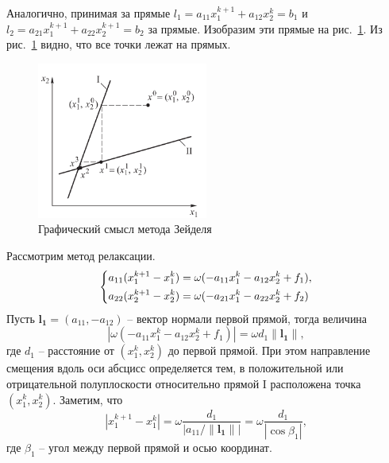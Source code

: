 \documentclass{article}
\begin{document}
\begin{enumerate}
\begin{equation}
        \end{equation}
        Аналогично, принимая за прямые $l_1 = a_{11}x_1^{k+1} + a_{12}x_2^k = b_1$ и 
        $l_2 = a_{21}x_1^{k+1} + a_{22}x_2^{k+1} = b_2$ за прямые. Изобразим эти прямые на 
        рис.~\ref{seidel_graph}. Из рис.~\ref{seidel_graph} видно, что все точки лежат на прямых.
        \begin{figure}[H]
            \center
            \includegraphics[width=0.5\textwidth]{seidel_graph.png}
            \caption{Графический смысл метода Зейделя}
            \label{seidel_graph}
        \end{figure}

        Рассмотрим метод релаксации. 
        \begin{equation}
            \begin{dcases}
                a_{11} (x_1^{k+1} - x_1^k) = \omega (-a_{11}x_1^k - a_{12}x_2^k +f_1), \\ 
                a_{22} (x_2^{k+1} - x_2^k) = \omega (-a_{21}x_1^k - a_{22}x_2^k +f_2)
            \end{dcases}
        \end{equation}
        Пусть $\boldsymbol{l_1} = (a_{11}, -a_{12})$ -- вектор нормали первой прямой, тогда 
        величина 
        \begin{equation*}
        |\omega (-a_{11}x_1^k - a_{12}x_2^k +f_1)| = \omega d_1 \|\boldsymbol{l_1}\|,
        \end{equation*}
        где $d_1$ -- расстояние от $(x_1^k, x_2^k)$ до первой прямой.
        При этом направление смещения вдоль оси
        абсцисс определяется тем, в положительной или отрицательной
        полуплоскости относительно прямой I расположена точка $(x_1^k, x_2^k)$.
        Заметим, что 
        \begin{equation*}
            |x_1^{k+1} - x_1^k| = \omega \dfrac{d_1}{|a_{11} / \|\boldsymbol{l_1}\||} = 
            \omega \dfrac{d_1}{|\cos \beta_1|},
        \end{equation*}
        где $\beta_1$ -- угол между первой прямой и осью координат.


\end{enumerate}
\end{document}
